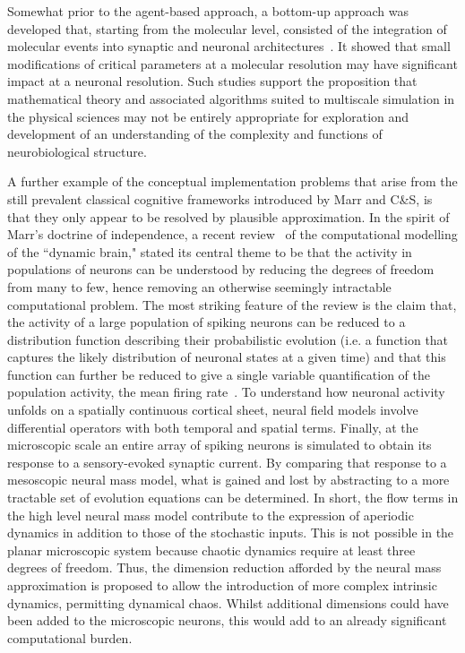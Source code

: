 \documentclass[11pt,3p,twocolumn]{JMN}
\begin{document}
Somewhat prior to the agent-based approach, a bottom-up approach was developed that, starting from the molecular level, consisted of the integration of molecular events into synaptic and neuronal architectures~\citep{bouteiller11}. It showed that small modifications of critical parameters at a molecular resolution may have significant impact at a neuronal resolution. Such studies support the proposition that mathematical theory and associated algorithms suited to multiscale simulation in the physical sciences may not be entirely appropriate for exploration and development of an understanding of the complexity and functions of neurobiological structure.

A further example of the conceptual implementation problems that arise from the still prevalent classical cognitive frameworks introduced by Marr and C\&S, is that they only appear to be resolved by plausible approximation. In the spirit of Marr's doctrine of independence, a recent review~\citep{deco08} of the computational modelling of the ``dynamic brain," stated its central theme to be that the activity in populations of neurons can be understood by reducing the degrees of freedom from many to few, hence removing an otherwise seemingly intractable computational problem. The most striking feature of the review is the claim that, the activity of a large population of spiking neurons can be reduced to a distribution function describing their probabilistic evolution (i.e. a function that captures the likely distribution of neuronal states at a given time) and that this function can further be reduced to give a single variable quantification of the population activity, the mean firing rate~\citep{deco08}. To understand how neuronal activity unfolds on a spatially continuous cortical sheet, neural field models involve differential operators with both temporal and spatial terms. Finally, at the microscopic scale an entire array of spiking neurons is simulated to obtain its response to a sensory-evoked synaptic current. By comparing that response to a mesoscopic neural mass model, what is gained and lost by abstracting to a more tractable set of evolution equations can be determined. In short, the flow terms in the high level neural mass model contribute to the expression of aperiodic dynamics in addition to those of the stochastic inputs. This is not possible in the planar microscopic system because chaotic dynamics require at least three degrees of freedom. Thus, the dimension reduction afforded by the neural mass approximation is proposed to allow the introduction of more complex intrinsic dynamics, permitting dynamical chaos. Whilst additional dimensions could have been added to the microscopic neurons, this would add to an already significant computational burden.
\end{document}
